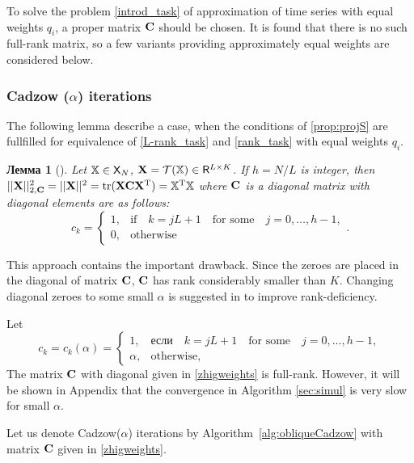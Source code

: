 \documentclass[12pt,a4paper,fleqn,leqno]{article}
\DeclareMathOperator{\tr}{tr}
\newtheorem{lemma}{Лемма}
\begin{document}
To solve the problem \eqref{introd_task} of approximation of time series with equal weights $q_i$, a proper matrix $\mathbf{C}$ should be chosen. It is found that there is no such full-rank matrix, so a few variants providing approximately equal weights are considered below.

\subsubsection{Cadzow ($\alpha$) iterations}
\label{sec:cadzow_alpha}
The following lemma describe a case, when the conditions of \ref{prop:projS} are fullfilled for equivalence of \eqref{L-rank_task} and \eqref{rank_task} with equal weights $q_i$.
\begin{lemma}[\cite{Gillard2014}]
\label{zhiglemma}
Let $\mathbb{X} \in \mathsf{X}_N$, $\mathbf{X} = \mathcal{T}(\mathbb{X}) \in \mathsf{R}^{L \times K}$. If $h = N/L$ is integer, then $||\bfX||^2_{2, \bfC} = ||\bfX||^2 = \tr(\bfX \bfC \bfX^\rmT) = \tsX^\rmT \tsX$ where $\mathbf{C}$ is a diagonal matrix with diagonal elements are as follows:
\begin{equation*}
c_k = \begin{cases}
1, & \text{if} \quad k = jL+1 \quad \text{for some} \quad j = 0, \ldots, h-1, \\
0, & \text{otherwise}
\end{cases}.
\end{equation*}
\end{lemma}

This approach contains the important drawback. Since the zeroes are placed in the diagonal of matrix $\mathbf{C}$, $\mathbf{C}$ has rank considerably smaller than $K$. Changing diagonal zeroes to some small $\alpha$ is suggested in \cite{Gillard2014} to improve rank-deficiency.

Let
\begin{equation}\label{zhigweights}
c_k = c_k(\alpha) = \begin{cases}
1, & \text{если} \quad k = jL+1 \quad \text{for some} \quad j = 0, \ldots, h-1, \\
\alpha, & \text{otherwise,}
\end{cases}
\end{equation}
The matrix $\mathbf{C}$ with diagonal given in \ref{zhigweights} is full-rank. However, it will be shown in Appendix that the convergence in Algorithm \ref{sec:simul} is very slow for small $\alpha$.

Let us denote Cadzow($\alpha$) iterations by Algorithm~\ref{alg:obliqueCadzow} with matrix $\mathbf{C}$  given in \eqref{zhigweights}.
\end{document}
